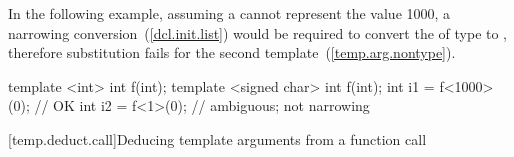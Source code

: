 \pnum
\begin{example}
In the following example,
assuming a 
cannot represent the value 1000,
a narrowing conversion~(\ref{dcl.init.list})
would be required
to convert the 
of type  to ,
therefore substitution fails for the
second template~(\ref{temp.arg.nontype}).

\begin{codeblock}
template <int> int f(int);
template <signed char> int f(int);
int i1 = f<1000>(0);         // OK
int i2 = f<1>(0);            // ambiguous; not narrowing
\end{codeblock}
\end{example}

[temp.deduct.call]{Deducing template arguments from a function call}

